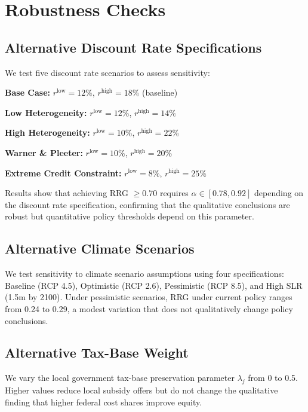 \documentclass[11pt,letterpaper]{article}
\theoremstyle{definition}
\begin{document}
\section{Robustness Checks}

\subsection{Alternative Discount Rate Specifications}

We test five discount rate scenarios to assess sensitivity:

\textbf{Base Case:} $r^{\text{low}} = 12\%$, $r^{\text{high}} = 18\%$ (baseline)

\textbf{Low Heterogeneity:} $r^{\text{low}} = 12\%$, $r^{\text{high}} = 14\%$

\textbf{High Heterogeneity:} $r^{\text{low}} = 10\%$, $r^{\text{high}} = 22\%$

\textbf{Warner \& Pleeter:} $r^{\text{low}} = 10\%$, $r^{\text{high}} = 20\%$

\textbf{Extreme Credit Constraint:} $r^{\text{low}} = 8\%$, $r^{\text{high}} = 25\%$

Results show that achieving RRG $\geq 0.70$ requires $\alpha \in [0.78, 0.92]$ depending on the discount rate specification, confirming that the qualitative conclusions are robust but quantitative policy thresholds depend on this parameter.

\subsection{Alternative Climate Scenarios}

We test sensitivity to climate scenario assumptions using four specifications: Baseline (RCP 4.5), Optimistic (RCP 2.6), Pessimistic (RCP 8.5), and High SLR (1.5m by 2100). Under pessimistic scenarios, RRG under current policy ranges from 0.24 to 0.29, a modest variation that does not qualitatively change policy conclusions.

\subsection{Alternative Tax-Base Weight}

We vary the local government tax-base preservation parameter $\lambda_j$ from 0 to 0.5. Higher values reduce local subsidy offers but do not change the qualitative finding that higher federal cost shares improve equity.




\end{document}
